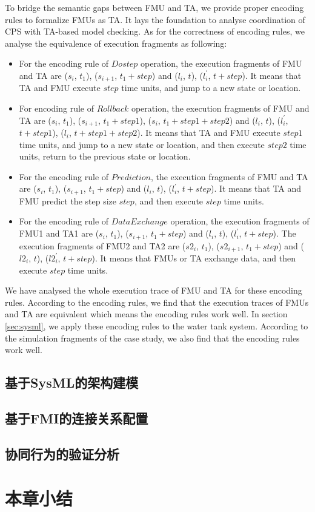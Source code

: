 To bridge the semantic gaps between FMU and TA, we provide proper encoding rules to formalize FMUs as TA. It lays the foundation to analyse coordination of CPS with TA-based model checking. 
As for the correctness of encoding rules, we analyse the equivalence of execution fragments as following:
\begin{itemize}
\item
For the encoding rule of $Dostep$ operation, the execution fragments of FMU and TA are ($s_{i}$, $t_{1}$), ($s_{i+1}$, $t_{1}+step$) and ($l_{i}$, $t$), ($l_{i}^{\prime}$, $t+step$). It means that TA and FMU execute $step$ time units, and jump to a new state or location.
\item 
For encoding rule of $Rollback$ operation, the execution fragments of FMU and TA are ($s_{i}$, $t_{1}$), ($s_{i+1}$, $t_{1}+step1$), ($s_{i}$, $t_{1}+step1+step2$) and ($l_{i}$, $t$), ($l_{i}^{\prime}$, $t+step1$), ($l_{i}$, $t+step1+step2$). It means that TA and FMU execute $step1$ time units, and jump to a new state or location, and then execute $step2$ time units, return to the previous state or location. 
\item
For the encoding rule of $Prediction$, the execution fragments of FMU and TA are ($s_{i}$, $t_{1}$), ($s_{i+1}$, $t_{1}+step$) and ($l_{i}$, $t$), ($l_{i}^{\prime}$, $t+step$). It means that TA and FMU predict the step size $step$, and then execute $step$ time units.
\item
For the encoding rule of $Data Exchange$ operation, the execution fragments of FMU1 and TA1 are ($s_{i}$, $t_{1}$), ($s_{i+1}$, $t_{1}+step$) and ($l_{i}$, $t$), ($l_{i}^{\prime}$, $t+step$). The execution fragments of FMU2 and TA2 are ($s2_{i}$, $t_{1}$), ($s2_{i+1}$, $t_{1}+step$) and ($l2_{i}$, $t$), ($l2_{i}^{\prime}$, $t+step$). It means that FMUs or TA exchange data, and then execute $step$ time units.
\end{itemize}
We have analysed the whole execution trace of FMU and TA for these encoding rules. According to the encoding rules, we find that the execution traces of FMUs and TA are equivalent which means the encoding rules work well. In section \ref{sec:sysml}, we apply these encoding rules to the water tank system. According to the simulation fragments of the case study, we also find that the encoding rules work well.
\subsection{基于SysML的架构建模} 
\subsection{基于FMI的连接关系配置} 

\subsection{协同行为的验证分析} 
\section{本章小结}

